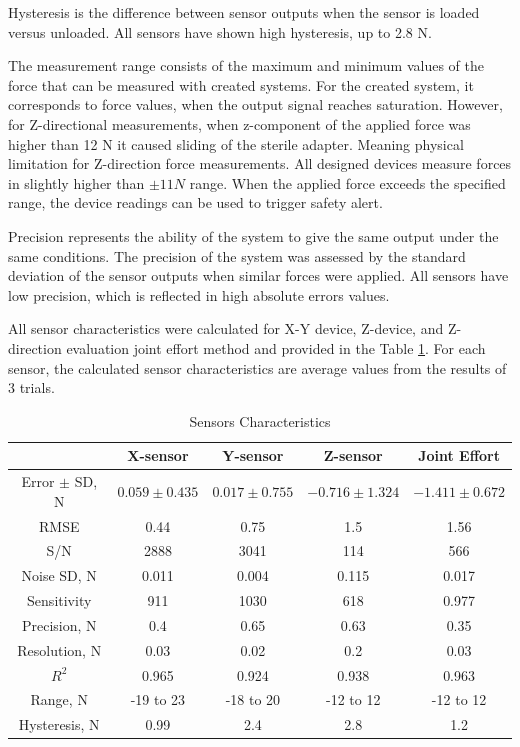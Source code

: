 Hysteresis is the difference between sensor outputs when the sensor is loaded versus unloaded. All sensors have shown high hysteresis, up to 2.8 N.

The measurement range consists of the maximum and minimum values of the force that can be measured with created systems. For the created system, it corresponds to force values, when the output signal reaches saturation. However, for Z-directional measurements, when z-component of the applied force was higher than 12 N it caused sliding of the sterile adapter. Meaning physical limitation for Z-direction force measurements. All designed devices measure forces in slightly higher than $\pm 11 N$ range. When the applied force exceeds the specified range, the device readings can be used to trigger safety alert.

Precision represents the ability of the system to give the same output under the same conditions. The precision of the system was assessed by the standard deviation of the sensor outputs when similar forces were applied.  All sensors have low precision, which is reflected in high absolute errors values.

All sensor characteristics were calculated for X-Y device, Z-device, and Z-direction evaluation joint effort method and provided in the Table \ref{tab:SenChar}. For each sensor, the calculated sensor characteristics are average values from the results of 3 trials.

\begin{table}[h]
\caption {Sensors Characteristics} \label{tab:SenChar} 
\begin{center}
\begin{tabular}{ | c | c | c | c | c | } 
\hline
 &  X-sensor & Y-sensor & Z-sensor & Joint Effort \\ 
\hline
Error $\pm$ SD, N & $0.059 \pm 0.435$ & $0.017 \pm 0.755$ & $-0.716 \pm 1.324$ & $-1.411 \pm 0.672$ \\ 
\hline
RMSE & 0.44 & 0.75 & 1.5 & 1.56 \\ 
\hline
S/N & 2888 & 3041 & 114 & 566 \\
\hline
Noise SD, N & 0.011 & 0.004 & 0.115 & 0.017 \\
\hline
Sensitivity & 911 & 1030 & 618 & 0.977 \\
\hline
Precision, N & 0.4 & 0.65 & 0.63 & 0.35 \\
\hline
Resolution, N & 0.03 & 0.02 & 0.2 & 0.03 \\
\hline
$R^2$ & 0.965 & 0.924 & 0.938 & 0.963 \\
\hline
Range, N & -19 to 23 & -18 to 20 & -12 to 12 & -12 to 12 \\
\hline
Hysteresis, N & 0.99 & 2.4 & 2.8 & 1.2 \\
\hline
\end{tabular}
\end{center}
\end{table}

